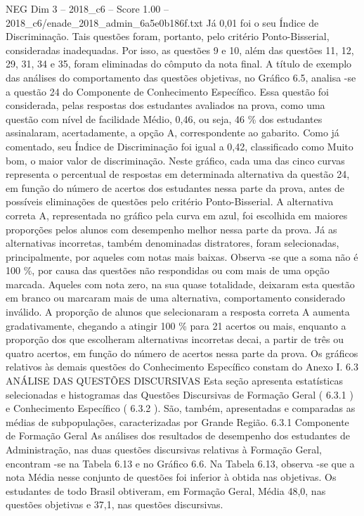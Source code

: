 \begin{textsample}{NEG Dim 3 – 2018\_c6 – Score 1.00 – 2018\_c6/enade\_2018\_admin\_6a5e0b186f.txt}
Já 0,01 foi o seu Índice de Discriminação.
Tais questões foram, portanto, pelo critério Ponto-Bisserial, consideradas inadequadas.
Por isso, as questões 9 e 10, além das questões 11, 12, 29, 31, 34 e 35, foram eliminadas do cômputo da nota final.
A título de exemplo das análises do comportamento das questões objetivas, no Gráfico 6.5, analisa -se a questão 24 do Componente de Conhecimento Específico.
Essa questão foi considerada, pelas respostas dos estudantes avaliados na prova, como uma questão com nível de facilidade Médio, 0,46, ou seja, 46 \% dos estudantes assinalaram, acertadamente, a opção A, correspondente ao gabarito.
Como já comentado, seu Índice de Discriminação foi igual a 0,42, classificado como Muito bom, o maior valor de discriminação.
Neste gráfico, cada uma das cinco curvas representa o percentual de respostas em determinada alternativa da questão 24, em função do número de acertos dos estudantes nessa parte da prova, antes de possíveis eliminações de questões pelo critério Ponto-Bisserial.
A alternativa correta A, representada no gráfico pela curva em azul, foi escolhida em maiores proporções pelos alunos com desempenho melhor nessa parte da prova.
Já as alternativas incorretas, também denominadas distratores, foram selecionadas, principalmente, por aqueles com notas mais baixas.
Observa -se que a soma não é 100 \%, por causa das questões não respondidas ou com mais de uma opção marcada.
Aqueles com nota zero, na sua quase totalidade, deixaram esta questão em branco ou marcaram mais de uma alternativa, comportamento considerado inválido.
A proporção de alunos que selecionaram a resposta correta A aumenta gradativamente, chegando a atingir 100 \% para 21 acertos ou mais, enquanto a proporção dos que escolheram alternativas incorretas decai, a partir de três ou quatro acertos, em função do número de acertos nessa parte da prova.
Os gráficos relativos às demais questões do Conhecimento Específico constam do Anexo I. 6.3 ANÁLISE DAS QUESTÕES DISCURSIVAS Esta seção apresenta estatísticas selecionadas e histogramas das Questões Discursivas de Formação Geral ( 6.3.1 ) e Conhecimento Específico ( 6.3.2 ).
São, também, apresentadas e comparadas as médias de subpopulações, caracterizadas por Grande Região. 6.3.1 Componente de Formação Geral As análises dos resultados de desempenho dos estudantes de Administração, nas duas questões discursivas relativas à Formação Geral, encontram -se na Tabela 6.13 e no Gráfico 6.6.
Na Tabela 6.13, observa -se que a nota Média nesse conjunto de questões foi inferior à obtida nas objetivas.
Os estudantes de todo Brasil obtiveram, em Formação Geral, Média 48,0, nas questões objetivas e 37,1, nas questões discursivas.

\end{textsample}
